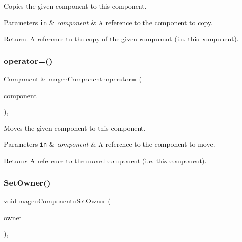 Copies the given component to this component.


\begin{DoxyParams}[1]{Parameters}
\mbox{\tt in}  & {\em component} & A reference to the component to copy. \\
\hline
\end{DoxyParams}
\begin{DoxyReturn}{Returns}
A reference to the copy of the given component (i.\+e. this component). 
\end{DoxyReturn}
\mbox{\label{classmage_1_1_component_ad45dae559785efbc090c0f83c1e08cd1}} 
\subsubsection{\texorpdfstring{operator=()}{operator=()}\hspace{0.1cm}{\footnotesize\ttfamily [2/2]}}
{\footnotesize\ttfamily \mbox{\hyperlink{classmage_1_1_component}{Component}} \& mage\+::\+Component\+::operator= (\begin{DoxyParamCaption}\item[{\mbox{\hyperlink{classmage_1_1_component}{Component}} \&\&}]{component }\end{DoxyParamCaption})\hspace{0.3cm}{\ttfamily [default]}, {\ttfamily [noexcept]}}

Moves the given component to this component.


\begin{DoxyParams}[1]{Parameters}
\mbox{\tt in}  & {\em component} & A reference to the component to move. \\
\hline
\end{DoxyParams}
\begin{DoxyReturn}{Returns}
A reference to the moved component (i.\+e. this component). 
\end{DoxyReturn}
\mbox{\label{classmage_1_1_component_aed5c7f7af79357f708c71572d7d99638}} 
\subsubsection{\texorpdfstring{Set\+Owner()}{SetOwner()}}
{\footnotesize\ttfamily void mage\+::\+Component\+::\+Set\+Owner (\begin{DoxyParamCaption}\item[{\mbox{\hyperlink{classmage_1_1_proxy_ptr}{Proxy\+Ptr}}$<$ \mbox{\hyperlink{classmage_1_1_node}{Node}} $>$}]{owner }\end{DoxyParamCaption})\hspace{0.3cm}{\ttfamily [private]}, {\ttfamily [noexcept]}}

